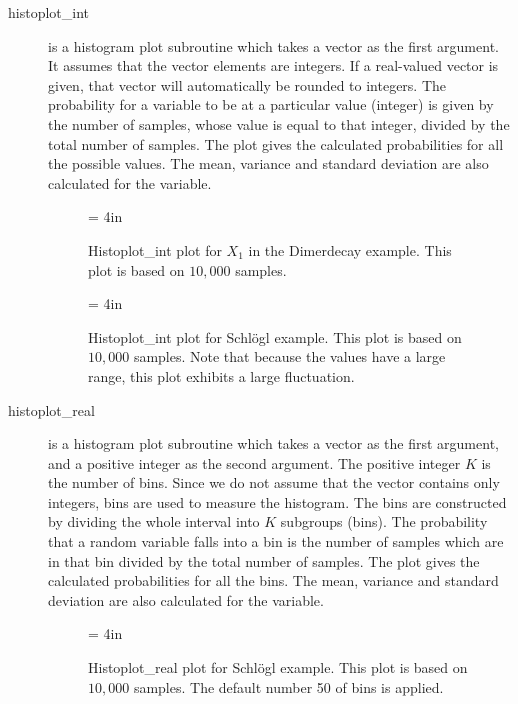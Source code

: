 \documentclass[12pt]{article}
\begin{document}
\begin{description}
\item[histoplot\_int] is a histogram plot subroutine which takes a vector as the first argument.
It assumes that the vector elements are integers. If a real-valued  vector is given, that
vector will automatically be rounded to integers. The probability for a variable to be
at a particular value (integer) is given by
the number of samples, whose value is equal to that integer,
divided by the total number of samples. The plot gives the calculated
probabilities for all the possible values. The mean, variance and standard deviation are
also calculated for the variable.


\begin{figure}
\begin{center}
\epsfxsize = 4in
\caption{   \label{dimerdistribution}
Histoplot\_int plot for $X_1$ in the Dimerdecay example. This plot is based on $10,000$ samples. }
\end{center}
\end{figure}

\begin{figure}
\begin{center}
\epsfxsize = 4in
\caption{   \label{schloglintdistribution}
Histoplot\_int plot for Schl\"ogl example. This plot is based on $10,000$ samples. Note
    that because the values have a large range, this plot exhibits a large fluctuation.
}
\end{center}
\end{figure}

\item[histoplot\_real] is a histogram plot subroutine which takes a vector as the first argument,
and a positive integer as the second argument. The positive integer $K$ is the number of bins. Since
we do not assume that the vector contains only integers, bins are used to measure the histogram.
The bins are constructed by dividing the whole interval into $K$ subgroups (bins).
The probability that a random variable falls into a bin is the number of samples which are in
that bin divided by the total number of samples. The plot gives the calculated
probabilities for all the bins. The mean, variance and standard deviation are
also calculated for the variable.

\begin{figure}
\begin{center}
\epsfxsize = 4in
\caption{   \label{schlogldistribution}
Histoplot\_real plot for Schl\"ogl example. This plot is based on $10,000$ samples. The
    default number 50 of bins is applied.
}
\end{center}
\end{figure}


\end{description}
\end{document}
